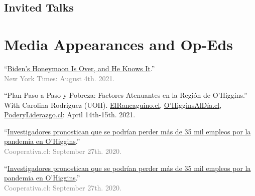 \documentclass[letterpaper]{article}
\renewenvironment{itemize}{
  \begin{list}{}{
    \setlength{\leftmargin}{1.5em}
  }
}{
  \end{list}
}
\begin{document}
\subsection*{Invited Talks}

{\unskip}


\section*{Media Appearances and Op-Eds}

  \begin{itemize}

    \item[\textcolor{gray}{\textbullet}] ``\href{https://www.nytimes.com/2021/08/04/opinion/biden-eviction-covid-democrats.html}{Biden's Honeymoon Is Over, and He Knows It}.''\\\textcolor{gray}{New York Times: August 4th. 2021.}

    \item[\textcolor{gray}{\textbullet}] ``{\color{blue}Plan Paso a Paso y Pobreza: Factores Atenuantes en la Región de O'Higgins}.''\\With Carolina Rodriguez (UOH). \href{https://www.elrancaguino.cl/2021/04/14/opinion-plan-paso-a-paso-y-pobreza-factores-atenuantes-en-la-region-de-ohiggins/}{ElRancaguino.cl}, \href{https://ohigginsaldia.cl/2021/04/14/plan-paso-a-paso-y-pobreza-factores-atenuantes-en-la-region-de-ohiggins/amp/?__twitter_impression=true}{O'HigginsAlD\'ia.cl}, \href{https://www.poderyliderazgo.cl/opinion-plan-paso-a-paso-y-pobreza-factores-atenuantes-en-la-region-de-ohiggins/}{PoderyLiderazgo.cl}: {\color{gray} April 14th-15th. 2021.}

    \item[\textcolor{gray}{\textbullet}] ``\href{https://cooperativa.cl/noticias/pais/region-de-ohiggins/investigadores-pronostican-que-se-podrian-perder-mas-de-35-mil-empleos/2020-09-27/110705.html}{Investigadores pronostican que se podr\'ian perder m\'as de 35 mil empleos por la pandemia en O'Higgins}.''\\\textcolor{gray}{Cooperativa.cl: September 27th. 2020.}
   
    \item[\textcolor{gray}{\textbullet}] ``\href{https://cooperativa.cl/noticias/pais/region-de-ohiggins/investigadores-pronostican-que-se-podrian-perder-mas-de-35-mil-empleos/2020-09-27/110705.html}{Investigadores pronostican que se podr\'ian perder m\'as de 35 mil empleos por la pandemia en O'Higgins}.''\\\textcolor{gray}{Cooperativa.cl: September 27th. 2020.}
   

\end{itemize}
\end{document}
